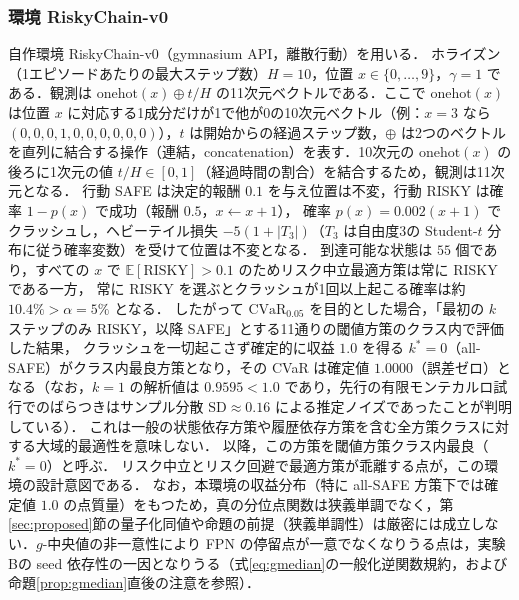 \documentclass[a4paper,10pt]{jsarticle}
\theoremstyle{definition}
\newcommand{\CVaR}{\mathrm{CVaR}}
\newcommand{\E}{\mathbb{E}}
\begin{document}
\subsubsection{環境 RiskyChain-v0}
自作環境 RiskyChain-v0（gymnasium API，離散行動）を用いる．
ホライズン（1エピソードあたりの最大ステップ数）$H=10$，位置 $x\in\{0,\dots,9\}$，$\gamma=1$ である．観測は $\mathrm{onehot}(x)\oplus t/H$ の11次元ベクトルである．ここで $\mathrm{onehot}(x)$ は位置 $x$ に対応する1成分だけが1で他が0の10次元ベクトル（例：$x=3$ なら $(0,0,0,1,0,0,0,0,0,0)$），$t$ は開始からの経過ステップ数，$\oplus$ は2つのベクトルを直列に結合する操作（連結，concatenation）を表す．10次元の $\mathrm{onehot}(x)$ の後ろに1次元の値 $t/H\in[0,1]$（経過時間の割合）を結合するため，観測は11次元となる．
行動 SAFE は決定的報酬 $0.1$ を与え位置は不変，行動 RISKY は確率 $1-p(x)$ で成功（報酬 $0.5$，$x\leftarrow x+1$），
確率 $p(x)=0.002(x+1)$ でクラッシュし，ヘビーテイル損失 $-5(1+|T_3|)$（$T_3$ は自由度3の Student-$t$ 分布に従う確率変数）を受けて位置は不変となる．
到達可能な状態は $55$ 個であり，すべての $x$ で $\E[\mathrm{RISKY}]>0.1$ のためリスク中立最適方策は常に RISKY である一方，
常に RISKY を選ぶとクラッシュが1回以上起こる確率は約 $10.4\%>\alpha=5\%$ となる．
したがって $\CVaR_{0.05}$ を目的とした場合，「最初の $k$ ステップのみ RISKY，以降 SAFE」とする11通りの閾値方策のクラス内で評価した結果，
クラッシュを一切起こさず確定的に収益 $1.0$ を得る $k^*=0$（all-SAFE）がクラス内最良方策となり，その CVaR は確定値 $1.0000$（誤差ゼロ）となる（なお，$k=1$ の解析値は $0.9595<1.0$ であり，先行の有限モンテカルロ試行でのばらつきはサンプル分散 $\mathrm{SD}\approx0.16$ による推定ノイズであったことが判明している）．
これは一般の状態依存方策や履歴依存方策を含む全方策クラスに対する大域的最適性を意味しない．
以降，この方策を閾値方策クラス内最良（$k^*=0$）と呼ぶ．
リスク中立とリスク回避で最適方策が乖離する点が，この環境の設計意図である．
なお，本環境の収益分布（特に all-SAFE 方策下では確定値 $1.0$ の点質量）をもつため，真の分位点関数は狭義単調でなく，第\ref{sec:proposed}節の量子化同値や命題の前提（狭義単調性）は厳密には成立しない．$g$-中央値の非一意性により FPN の停留点が一意でなくなりうる点は，実験Bの seed 依存性の一因となりうる（式\eqref{eq:gmedian}の一般化逆関数規約，および命題\ref{prop:gmedian}直後の注意を参照）．
\end{document}
